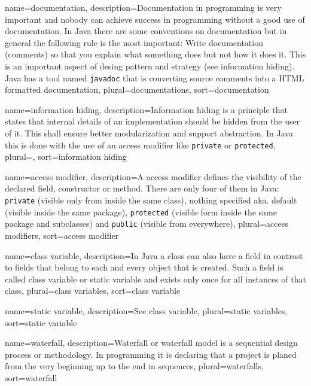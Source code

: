 {
	name=documentation,
	description={Documentation in programming is very important and nobody
		can achieve success in programming without a good use of
		documentation. In Java there are some conventions on 
		documentation but in general the following rule is the most
		important: Write documentation (comments) so that you 
		explain what something does but not how it does it. This is
		an important aspect of desing pattern and strategy (see
		\gls{information hiding}). 
		Java has a tool named \lstinline!javadoc!
		that is converting source comments into a HTML formatted
		documentation},
	plural=documentations,
	sort=documentation
}

{
	name={information hiding},
	description={Information hiding is a principle that states that 
		internal details of an implementation should be hidden
		from the user of it. This shall ensure better modularization
		and support abstraction. In Java this is done with the use
		of an \gls{access modifier} like \lstinline!private! or
		\lstinline!protected!},
	plural={},
	sort={information hiding}
}

{
	name={access modifier},
	description={A access modifier defines the visibility of the 
		declared field, constructor or method. There are only four of
		them in Java: 
		\lstinline!private! (visible only from inside the same class), 
		nothing specified aka. default (visible inside the same package),
		\lstinline!protected! (visible form inside the same package 
			and subclasses) and
		\lstinline!public! (visible from everywhere)},
	plural={access modifiers},
	sort={access modifier}
}

{
	name={class variable},
	description={In Java a class can also have a field in contrast to 
		fields that belong to each and every object that is created.
		Such a field is called class variable or 
		\gls{static variable} and exists only once for all instances
		of that class},
	plural={class variables},
	sort={class variable}
}

{
	name={static variable},
	description={See \gls{class variable}},
	plural={static variables},
	sort={static variable}	
}

{
	name=waterfall,
	description={Waterfall or waterfall model is a sequential design 
		process or methodology. In programming it is declaring 
		that a project is planed from the very beginning up to 
		the end in sequences},
	plural=waterfalls,
	sort=waterfall
}

